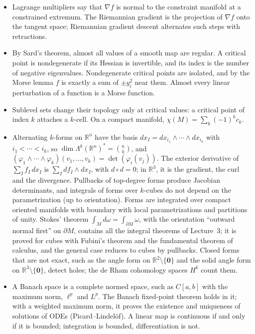 \begin{itemize}[leftmargin=*]
    \item Lagrange multipliers say that $\nabla f$ is normal to the constraint manifold at a constrained extremum. The Riemannian gradient is the projection of $\nabla f$ onto the tangent space; Riemannian gradient descent alternates such steps with retractions.
    \item By Sard's theorem, almost all values of a smooth map are regular. A critical point is nondegenerate if its Hessian is invertible, and its index is the number of negative eigenvalues. Nondegenerate critical points are isolated, and by the Morse lemma $f$ is exactly a sum of $\pm y_i^2$ near them. Almost every linear perturbation of a function is a Morse function.
    \item Sublevel sets change their topology only at critical values: a critical point of index $k$ attaches a $k$-cell. On a compact manifold, $\chi(M) = \sum_k (-1)^k c_k$.
    \item Alternating $k$-forms on $\mathbb{R}^n$ have the basis $dx_I = dx_{i_1} \wedge \cdots \wedge dx_{i_k}$ with $i_1 < \cdots < i_k$, so $\dim \Lambda^k(\mathbb{R}^n)^* = \binom{n}{k}$, and $(\varphi_1 \wedge \cdots \wedge \varphi_k)(v_1, \ldots, v_k) = \det(\varphi_i(v_j))$. The exterior derivative of $\sum_I f_I\, dx_I$ is $\sum_I df_I \wedge dx_I$, with $d \circ d = 0$; in $\mathbb{R}^3$, it is the gradient, the curl and the divergence. Pullbacks of top-degree forms produce Jacobian determinants, and integrals of forms over $k$-cubes do not depend on the parametrization (up to orientation). Forms are integrated over compact oriented manifolds with boundary with local parametrizations and partitions of unity. Stokes' theorem $\int_M d\omega = \int_{\partial M} \omega$, with the orientation ``outward normal first'' on $\partial M$, contains all the integral theorems of Lecture~3; it is proved for cubes with Fubini's theorem and the fundamental theorem of calculus, and the general case reduces to cubes by pullbacks. Closed forms that are not exact, such as the angle form on $\mathbb{R}^2 \setminus \{\mathbf{0}\}$ and the solid angle form on $\mathbb{R}^3 \setminus \{\mathbf{0}\}$, detect holes; the de Rham cohomology spaces $H^k$ count them.
    \item A Banach space is a complete normed space, such as $C[a, b]$ with the maximum norm, $\ell^p$ and $L^p$. The Banach fixed-point theorem holds in it; with a weighted maximum norm, it proves the existence and uniqueness of solutions of ODEs (Picard--Lindel\"of). A linear map is continuous if and only if it is bounded; integration is bounded, differentiation is not.

\end{itemize}
